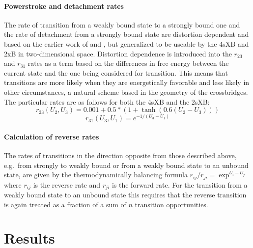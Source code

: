 \documentclass[]{article}
\begin{document}
\paragraph{Powerstroke and detachment rates} %
The rate of transition from a weakly bound state to a strongly bound one and the rate of detachment from a strongly bound state are distortion dependent and based on the earlier work of \citet{Pate:1989:p181} and \citet{Tanner:2007:pe115}, but generalized to be useable by the 4sXB and 2xB in two-dimensional space. %
Distortion dependence is introduced into the $r_{23}$ and $r_{31}$ rates as a term based on the differences in free energy between the current state and the one being considered for transition. 
This means that transitions are more likely when they are energetically favorable and less likely in other circumstances, a natural scheme based in the geometry of the crossbridges.
The particular rates are as follows for both the 4sXB and the 2sXB:
$$r_{23}(U_2, U_3) = 0.001 + 0.5 * (1 + \tanh(0.6 (U_2 - U_3))) $$
$$r_{31}(U_3, U_1) = e^{-1 / (U_3 - U_1)}$$

\paragraph{Calculation of reverse rates} %
The rates of transitions in the direction opposite from those described above, e.g.\ from strongly to weakly bound or from a weakly bound state to an unbound state, are given by the thermodynamically balancing formula $r_{ij}/r_{ji}=\exp^{U_i-U_j}$ where $r_{ij}$ is the reverse rate and $r_{ji}$ is the forward rate.
For the transition from a weakly bound state to an unbound state this requires that the reverse transition is again treated as a fraction of a sum of $n$ transition opportunities.



\section{Results} %

\end{document}
